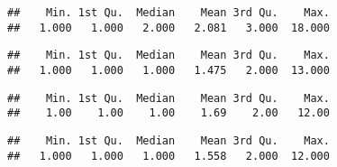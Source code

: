 \documentclass[
]{article}
\newenvironment{Shaded}{\begin{snugshade}}{\end{snugshade}}
\newcommand{\DecValTok}[1]{\textcolor[rgb]{0.00,0.00,0.81}{#1}}
\newcommand{\KeywordTok}[1]{\textcolor[rgb]{0.13,0.29,0.53}{\textbf{#1}}}
\newcommand{\NormalTok}[1]{#1}
\newcommand{\OperatorTok}[1]{\textcolor[rgb]{0.81,0.36,0.00}{\textbf{#1}}}
\begin{document}
\begin{Shaded}
\end{Shaded}

\begin{verbatim}
##    Min. 1st Qu.  Median    Mean 3rd Qu.    Max. 
##   1.000   1.000   2.000   2.081   3.000  18.000
\end{verbatim}

\begin{Shaded}
\end{Shaded}

\begin{verbatim}
##    Min. 1st Qu.  Median    Mean 3rd Qu.    Max. 
##   1.000   1.000   1.000   1.475   2.000  13.000
\end{verbatim}

\begin{Shaded}
\end{Shaded}

\begin{verbatim}
##    Min. 1st Qu.  Median    Mean 3rd Qu.    Max. 
##    1.00    1.00    1.00    1.69    2.00   12.00
\end{verbatim}

\begin{Shaded}
\end{Shaded}

\begin{verbatim}
##    Min. 1st Qu.  Median    Mean 3rd Qu.    Max. 
##   1.000   1.000   1.000   1.558   2.000  12.000
\end{verbatim}

\begin{Shaded}
\end{Shaded}
\end{document}

